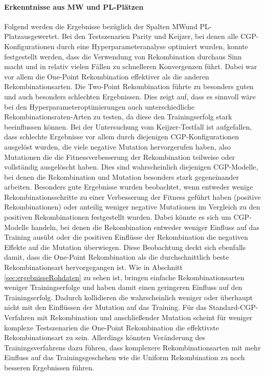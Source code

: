 \paragraph{Erkenntnisse aus MW und PL-Plätzen}
Folgend werden die Ergebnisse bezüglich der Spalten \glqq MW\grqq\space und \glqq PL-Platz\grqq\space ausgewertet.
Bei den Testszenarien Parity und Keijzer, bei denen alle CGP-Konfigurationen durch eine Hyperparameteranalyse optimiert wurden, konnte festgestellt werden, dass die Verwendung von Rekombination durchaus Sinn macht und in relativ vielen Fällen zu schnelleren Konvergenzen führt.
Dabei war vor allem die One-Point Rekombination effektiver als die anderen Rekombinationsarten.
Die Two-Point Rekombination führte zu besonders guten und auch besonders schlechten Ergebnissen.
Dies zeigt auf, dass es sinnvoll wäre bei den Hyperparameteroptimierungen auch unterschiedliche Rekombinationsraten-Arten zu testen, da diese den Trainingserfolg stark beeinflussen können.
Bei der Untersuchung vom Keijzer-Testfall ist aufgefallen, dass schlechte Ergebnisse vor allem durch diejenigen CGP-Konfigurationen ausgelöst wurden, die viele negative Mutation hervorgerufen haben, also Mutationen die die Fitnessverbesserung der Rekombination teilweise oder vollständig ausgelöscht haben.
Dies sind wahrscheinlich diejenigen CGP-Modelle, bei denen die Rekombination und Mutation besonders stark gegeneinander arbeiten.
Besonders gute Ergebnisse wurden beobachtet, wenn entweder wenige Rekombinationsschritte zu einer Verbesserung der Fitness geführt haben (positive Rekombinationen) oder anteilig weniger negative Mutationen im Vergleich zu den positiven Rekombinationen festgestellt wurden.
Dabei könnte es sich um CGP-Modelle handeln, bei denen die Rekombination entweder weniger Einfluss auf das Training ausübt oder die positiven Einflüsse der Rekombination die negativen Effekte auf die Mutation überwiegen.
Diese Beobachtung deckt sich ebenfalls damit, dass die One-Point Rekombination als die durchschnittlich beste Rekombinationsart hervorgegangen ist.
Wie in Abschnitt \ref{sec:ergebnisseRohdaten} zu sehen ist, bringen einfache Rekombinationsarten weniger Trainingserfolge und haben damit einen geringeren Einfluss auf den Trainingserfolg.
Dadurch kollidieren die wahrscheinlich weniger oder überhaupt nicht mit den Einflüssen der Mutation auf das Training.
Für das Standard-CGP-Verfahren mit Rekombination und anschließender Mutation scheint für weniger komplexe Testszenarien die One-Point Rekombination die effektivste Rekombinationsart zu sein.
Allerdings könnten Veränderung des Trainingsverfahrens dazu führen, dass komplexere Rekombinationsarten mit mehr Einfluss auf das Trainingsgeschehen wie die Uniform Rekombination zu noch besseren Ergebnissen führen.\\
